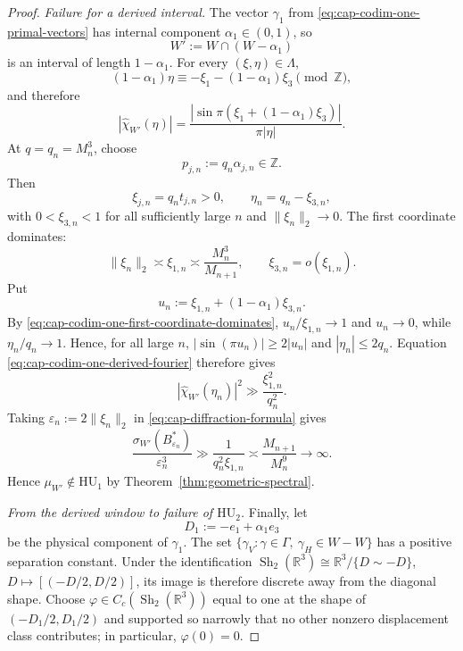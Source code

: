 \documentclass[10pt,a4paper]{amsart}
\newcommand{\HU}{\mathrm{HU}}
\newcommand{\Sh}{\operatorname{Sh}}
\begin{document}
\begin{proof}
\smallskip\noindent\emph{Failure for a derived interval.}
The vector $\gamma_1$ from \eqref{eq:cap-codim-one-primal-vectors} has internal
component $\alpha_1\in(0,1)$, so
\begin{equation}\label{eq:cap-codim-one-derived-window}
  W':=W\cap(W-\alpha_1)
\end{equation}
is an interval of length $1-\alpha_1$.  For every $(\xi,\eta)\in\Lambda$,
\[
  (1-\alpha_1)\eta
  \equiv-\xi_1-(1-\alpha_1)\xi_3\pmod{\mathbb Z},
\]
and therefore
\begin{equation}\label{eq:cap-codim-one-derived-fourier}
  |\widehat{\chi}_{W'}(\eta)|
  =\frac{|\sin\pi(\xi_1+(1-\alpha_1)\xi_3)|}{\pi|\eta|}.
\end{equation}
At $q=q_n=M_n^3$, choose
\begin{equation}\label{eq:cap-codim-one-special-dual-p}
  p_{j,n}:=q_n\alpha_{j,n}\in\mathbb Z.
\end{equation}
Then
\[
  \xi_{j,n}=q_nt_{j,n}>0,
  \qquad
  \eta_n=q_n-\xi_{3,n},
\]
with $0<\xi_{3,n}<1$ for all sufficiently large $n$ and
$\|\xi_n\|_2\to0$.  The first coordinate dominates:
\begin{equation}\label{eq:cap-codim-one-first-coordinate-dominates}
  \|\xi_n\|_2\asymp\xi_{1,n}
  \asymp\frac{M_n^3}{M_{n+1}},
  \qquad
  \xi_{3,n}=o(\xi_{1,n}).
\end{equation}
Put
\[
  u_n:=\xi_{1,n}+(1-\alpha_1)\xi_{3,n}.
\]
By \eqref{eq:cap-codim-one-first-coordinate-dominates},
$u_n/\xi_{1,n}\to1$ and $u_n\to0$, while
$\eta_n/q_n\to1$.  Hence, for all large $n$,
$|\sin(\pi u_n)|\geq 2|u_n|$ and $|\eta_n|\leq2q_n$.  Equation
\eqref{eq:cap-codim-one-derived-fourier} therefore gives
\begin{equation}\label{eq:cap-codim-one-derived-atom-size}
  |\widehat{\chi}_{W'}(\eta_n)|^2
  \gg\frac{\xi_{1,n}^2}{q_n^2}.
\end{equation}
Taking $\varepsilon_n:=2\|\xi_n\|_2$ in
\eqref{eq:cap-diffraction-formula} gives
\begin{equation}\label{eq:cap-codim-one-derived-nonhu}
  \frac{\sigma_{W'}(B_{\varepsilon_n}^*)}{\varepsilon_n^3}
  \gg\frac1{q_n^2\xi_{1,n}}
  \asymp\frac{M_{n+1}}{M_n^9}
  \longrightarrow\infty.
\end{equation}
Hence $\mu_{W'}\notin\HU_1$ by
Theorem~\ref{thm:geometric-spectral}.

\smallskip\noindent\emph{From the derived window to failure of $\HU_2$.}
Finally, let
\begin{equation}\label{eq:cap-codim-one-D1}
  D_1:=-e_1+\alpha_1e_3
\end{equation}
be the physical component of $\gamma_1$.  The set
\(
  \{\gamma_V:\gamma\in\Gamma,\ \gamma_H\in W-W\}
\)
has a positive separation constant.  Under the identification
$\Sh_2(\mathbb R^3)\cong\mathbb R^3/\{D\sim-D\}$,
$D\mapsto[(-D/2,D/2)]$, its image is therefore discrete away from the
diagonal shape.  Choose
$\varphi\in C_c(\Sh_2(\mathbb R^3))$ equal to one at the shape of
$(-D_1/2,D_1/2)$ and supported so narrowly that no other nonzero displacement
class contributes; in particular, $\varphi(0)=0$.


\end{proof}
\end{document}

